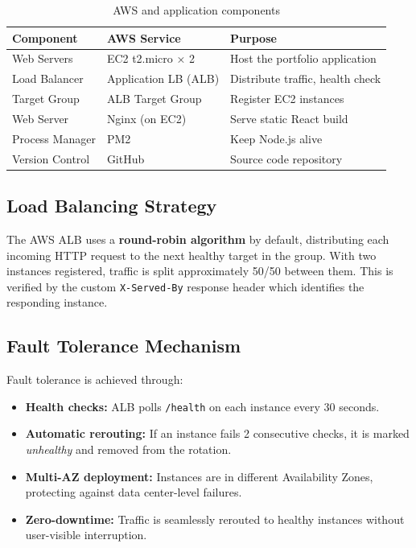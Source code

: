 \documentclass[12pt,a4paper]{article}
\begin{document}
\begin{table}[H]
\centering
\begin{tabular}{lll}
\toprule
\textbf{Component} & \textbf{AWS Service} & \textbf{Purpose} \\
\midrule
Web Servers       & EC2 t2.micro × 2      & Host the portfolio application \\
Load Balancer     & Application LB (ALB)  & Distribute traffic, health check \\
Target Group      & ALB Target Group      & Register EC2 instances \\
Web Server        & Nginx (on EC2)        & Serve static React build \\
Process Manager   & PM2                   & Keep Node.js alive \\
Version Control   & GitHub                & Source code repository \\
\bottomrule
\end{tabular}
\caption{AWS and application components}
\end{table}

\subsection{Load Balancing Strategy}

The AWS ALB uses a \textbf{round-robin algorithm} by default, distributing each incoming HTTP request to the next healthy target in the group. With two instances registered, traffic is split approximately 50/50 between them. This is verified by the custom \texttt{X-Served-By} response header which identifies the responding instance.

\subsection{Fault Tolerance Mechanism}

Fault tolerance is achieved through:
\begin{itemize}
  \item \textbf{Health checks:} ALB polls \texttt{/health} on each instance every 30 seconds.
  \item \textbf{Automatic rerouting:} If an instance fails 2 consecutive checks, it is marked \textit{unhealthy} and removed from the rotation.
  \item \textbf{Multi-AZ deployment:} Instances are in different Availability Zones, protecting against data center-level failures.
  \item \textbf{Zero-downtime:} Traffic is seamlessly rerouted to healthy instances without user-visible interruption.
\end{itemize}
\end{document}
